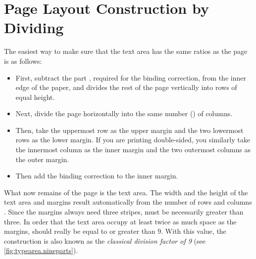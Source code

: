 \section{Page Layout Construction by Dividing}
\label{sec:typearea.divConstruction}

\begin{Explain}
  The easiest way to make sure that the text area has the same ratios
  as the page is as follows:
  \begin{itemize}
  \item First, subtract the part , required for the binding
    correction, from the inner edge of the paper,
    and divides the rest of the page vertically into  rows of equal
    height.
  \item Next, divide the page horizontally into the same number () of
    columns.
  \item Then, take the uppermost row as the upper margin and the two lowermost
    rows as the lower margin. If you are printing double-sided, you similarly
    take the innermost column as the inner margin and the two outermost
    columns as the outer margin.
  \item Then add the binding correction  to the inner margin.
  \end{itemize}
  What now remains of the page is the text area. The width
  and the height of the text area and margins result automatically from the
  number of rows and columns . Since the margins always need three
  stripes,  must be necessarily greater than three. In order that the
  text area occupy at least twice as much space as the margins, 
  should really be equal to or greater than 9. With this value, the
  construction is also known as the \emph{classical division factor of 9} (see
  \autoref{fig:typearea.nineparts}).


\end{Explain}
